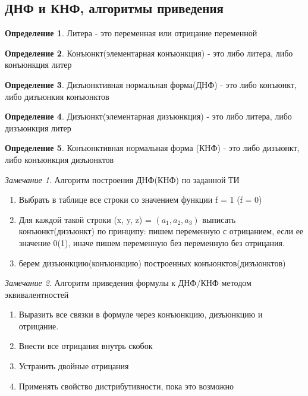 \documentclass[a4paper]{article}
\theoremstyle{definition}
\newtheorem*{definition}{Определение}
\theoremstyle{remark}
\newtheorem*{remark}{Замечание}
\begin{document}
    \subsection{ДНФ и КНФ, алгоритмы приведения}
	\begin{definition}
		Литера - это переменная или отрицание переменной
	\end{definition}
	\begin{definition}
		Конъюнкт(элементарная конъюнкция) - это либо литера, либо конъюнкция литер
	\end{definition}
	\begin{definition}
		Дизъюнктивная нормальная форма(ДНФ) -  это либо конъюнкт, либо дизъюнкия конъюнктов
	\end{definition}
	\begin{definition}
		Дизъюнкт(элементарная дизъюнкция) - это либо литера, либо дизъюнкция литер
	\end{definition}
	\begin{definition}
		Конъюнктивная нормальная форма (КНФ) - это либо дизъюнкт, либо конъюнкция дизъюнктов
	\end{definition}
	\begin{remark}
		Алгоритм построения ДНФ(КНФ) по заданной ТИ
		\begin{enumerate}
			\item Выбрать в таблице все строки со значением функции f = 1 (f = 0)
			\item Для каждой такой строки (x, y, z) = $(a_1, a_2, a_3)$ выписать конъюнкт(дизъюнкт) по принципу: пишем переменную с отрицанием, если ее значение 0(1), иначе пишем переменную без переменную без отрицания.
			\item берем дизъюнкцию(конъюнкцию) построенных конъюнктов(дизъюнктов)
		\end{enumerate}
	\end{remark}
	\begin{remark}
		Алгоритм приведения формулы к ДНФ/КНФ методом эквивалентностей
		\begin{enumerate}
			\item Выразить все связки в формуле через конъюнкцию, дизъюнкцию и отрицание.
			\item Внести все отрицания внутрь скобок
			\item Устранить двойные отрицания
			\item Применять свойство дистрибутивности, пока это возможно
		\end{enumerate}
	\end{remark}
\end{document}
